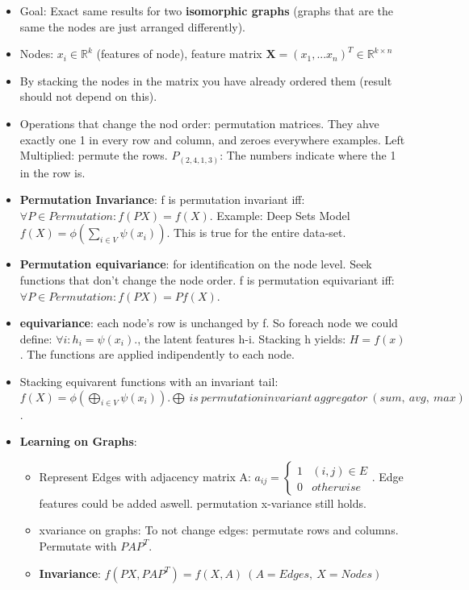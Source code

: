 \begin{itemize}[noitemsep,nolistsep]
	\item Goal: Exact same results for two \textbf{isomorphic graphs} (graphs that are the same the nodes are just arranged differently).
	\item Nodes: $x_i \in \mathbb{R}^k$ (features of node), feature matrix $\mathbf{X} = (x_1,...x_n)^T \in \mathbb{R}^{k \times n}$
	\item By stacking the nodes in the matrix you have already ordered them (result should not depend on this).
	\item Operations that change the nod order: permutation matrices. They ahve exactly one 1 in every row and column, and zeroes everywhere examples. Left Multiplied: permute the rows. $P_{(2,4,1,3)}$: The numbers indicate where the 1 in the row is.
	\item \textbf{Permutation Invariance}: f is permutation invariant iff: $\forall P \in Permutation: f(PX) = f(X)$. Example: Deep Sets Model $f(X) = \phi(\sum_{i \in V} \psi(x_i))$. This is true for the entire data-set.
	\item \textbf{Permutation equivariance}: for identification on the node level. Seek functions that don't change the node order. f is permutation equivariant iff: $\forall P \in Permutation: f(PX) = Pf(X)$.
	\item \textbf{equivariance}: each node's row is unchanged by f. So foreach node we could define: $\forall i: h_i = \psi(x_i).$, the latent features h-i. Stacking h yields: $H=f(x)$. The functions are applied indipendently to each node.
	\item Stacking equivarent functions with an invariant tail: $f(X) = \phi(\bigoplus_{i \in V}\psi(x_i)). \bigoplus\ is\ permutationinvariant\ aggregator\ (sum,\ avg,\ max)$.
	\item \textbf{Learning on Graphs}:
	\begin{itemize}[noitemsep,nolistsep]
		\item Represent Edges with adjacency matrix A: $a_{ij} = \begin{cases} 1& (i,j) \in E \\ 0 & otherwise \end{cases}$. Edge features could be added aswell. permutation x-variance still holds.
		\item xvariance on graphs: To not change edges: permutate rows and columns. Permutate with $PAP^T$.
		\item \textbf{Invariance}: $f(PX,PAP^T) = f(X,A)\ (A = Edges,\ X = Nodes)$

\end{itemize}
\end{itemize}
